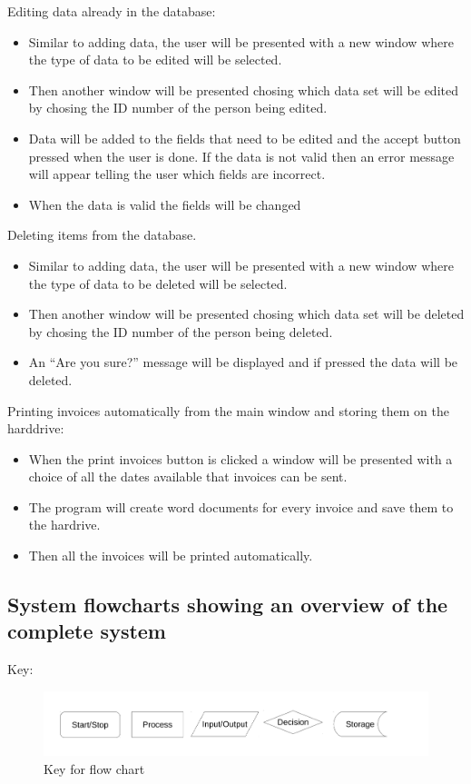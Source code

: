 Editing data already in the database:
\begin{itemize}
	\item Similar to adding data, the user will be presented with a new window where the type of data to be edited will be selected.
	\item Then another window will be presented chosing which data set will be edited by chosing the ID number of the person being edited.
	\item Data will be added to the fields that need to be edited and the accept button pressed when the user is done. If the data is not valid then an error message will appear telling the user which fields are incorrect.
	\item When the data is valid the fields will be changed
\end{itemize}

Deleting items from the database.
\begin{itemize}
	\item Similar to adding data, the user will be presented with a new window where the type of data to be deleted will be selected.
	\item Then another window will be presented chosing which data set will be deleted by chosing the ID number of the person being deleted.
	\item An ``Are you sure?'' message will be displayed and if pressed the data will be deleted.
 
\end{itemize}

Printing invoices automatically from the main window and storing them on the harddrive:
\begin{itemize}
	\item When the print invoices button is clicked a window will be presented with a choice of all the dates available that invoices can be sent.
	\item The program will create word documents for every invoice and save them to the hardrive.
	\item Then all the invoices will be printed automatically.
\end{itemize}

\subsection{System flowcharts showing an overview of the complete system}

Key:
\begin{figure}[H]
\includegraphics[width=\textwidth]{./Design/images/FC_key.pdf}
    \caption{Key for flow chart} \label{fig:Flow Chart Key}
\end{figure}

